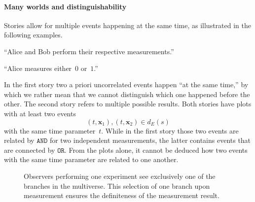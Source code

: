 \documentclass[aps,pra,twocolumn]{revtex4-1}
\newcommand{\AND}{\mathtt{AND}}
\newcommand{\OR}{\mathtt{OR}}
\theoremstyle{definition}
\theoremstyle{remark}
\begin{document}
\paragraph{Many worlds and distinguishability} Stories allow for multiple events happening at the same time, as illustrated in the following examples.
\begin{displayquote}
``Alice and Bob perform their respective measurements.''
\end{displayquote}
\begin{displayquote}
``Alice measures either~$0$ or~$1$.''
\end{displayquote}
In the first story two a priori uncorrelated events happen ``at the same time,'' by which we rather mean that we cannot distinguish which one happened before the other.
The second story refers to multiple possible results.
Both stories have plots with at least two events
\begin{equation*}
  (t, \bm{x}_1), (t,\bm{x}_2) \in d_E(s)
\end{equation*}
with the same time parameter~$t$.
While in the first story those two events are related by $\AND$ for two independent measurements, the latter contains events that are connected by $\OR$.
From the plots alone, it cannot be deduced how two events with the same time parameter are related to one another.
\begin{figure}
\begin{center}
\end{center}
\caption{Observers performing one experiment see exclusively one of the branches in the multiverse. This selection of one branch upon measurement ensures the definiteness of the measurement result.}
\label{fig:many worlds}
\end{figure}
\end{document}
